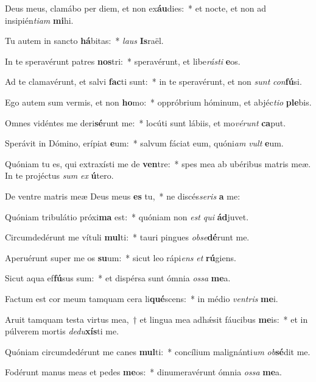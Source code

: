 \item Deus meus, clamábo per diem, et non ex\textbf{áu}dies:~* et nocte, et non ad insipién\textit{ti}\textit{am} \textbf{mi}hi.
\item Tu autem in sancto \textbf{há}bitas:~* \textit{laus} \textbf{Is}raël.
\item In te speravérunt patres \textbf{nos}tri:~* speravérunt, et libe\textit{rás}\textit{ti} \textbf{e}os.
\item Ad te clamavérunt, et salvi \textbf{fac}ti sunt:~* in te speravérunt, et non \textit{sunt} \textit{con}\textbf{fú}si.
\item Ego autem sum vermis, et non \textbf{ho}mo:~* oppróbrium hóminum, et abjéc\textit{ti}\textit{o} \textbf{ple}bis.
\item Omnes vidéntes me deri\textbf{sé}runt me:~* locúti sunt lábiis, et mo\textit{vé}\textit{runt} \textbf{ca}put.
\item Sperávit in Dómino, erípiat \textbf{e}um:~* salvum fáciat eum, quóni\textit{am} \textit{vult} \textbf{e}um.
\item Quóniam tu es, qui extraxísti me de \textbf{ven}tre:~* spes mea ab ubéribus matris meæ. In te projéctus \textit{sum} \textit{ex} \textbf{ú}tero.
\item De ventre matris meæ Deus meus \textbf{es} tu,~* ne discés\textit{se}\textit{ris} \textbf{a} me:
\item Quóniam tribulátio próxi\textbf{ma} est:~* quóniam non \textit{est} \textit{qui} \textbf{ád}juvet.
\item Circumdedérunt me vítuli \textbf{mul}ti:~* tauri pingues \textit{ob}\textit{se}\textbf{dé}runt me.
\item Aperuérunt super me os \textbf{su}um:~* sicut leo rápi\textit{ens} \textit{et} \textbf{rú}giens.
\item Sicut aqua ef\textbf{fú}sus sum:~* et dispérsa sunt ómnia \textit{os}\textit{sa} \textbf{me}a.
\item Factum est cor meum tamquam cera li\textbf{qué}scens:~* in médio \textit{ven}\textit{tris} \textbf{me}i.
\item Aruit tamquam testa virtus mea,~† et lingua mea adhǽsit fáucibus \textbf{me}is:~* et in púlverem mortis \textit{de}\textit{du}\textbf{xís}ti me.
\item Quóniam circumdedérunt me canes \textbf{mul}ti:~* concílium malignánti\textit{um} \textit{ob}\textbf{sé}dit me.
\item Fodérunt manus meas et pedes \textbf{me}os:~* dinumeravérunt ómnia \textit{os}\textit{sa} \textbf{me}a.
